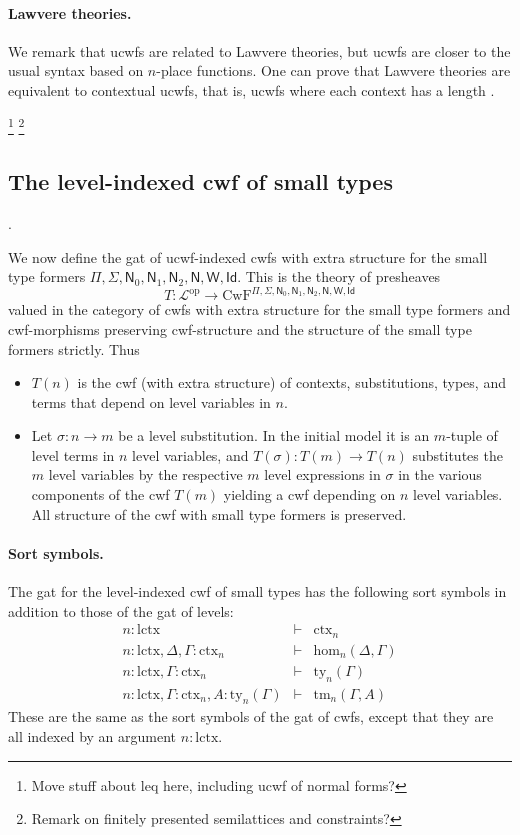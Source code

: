 \documentclass[11pt,a4paper]{article}
\theoremstyle{definition}
\newcommand{\Id}{\mathsf{Id}}
\newcommand{\N}{\mathsf{N}}
\def\Hom{\mathrm{hom}}
\def\lctx{\mathrm{lctx}}
\def\leq{\mathrm{leq}}
\newcommand{\ctx}{\mathrm{ctx}}
\newcommand{\ty}{\mathrm{ty}}
\newcommand{\tm}{\mathrm{tm}}
\def\L{{\mathcal{L}}}
\def\CwF{\mathrm{CwF}}
\def\W{\mathsf{W}}
\begin{document}
\paragraph{Lawvere theories.} We remark that ucwfs are related to Lawvere theories, but ucwfs are closer to the usual syntax based on $n$-place functions. One can prove that Lawvere theories are equivalent to contextual ucwfs, that is, ucwfs where each context has a length \cite{castellan:lambek}.

\footnote{Move stuff about $\leq$ here, including ucwf of normal forms?}
\footnote{Remark on finitely presented semilattices and constraints?}


\subsection{The level-indexed cwf of small types}\label{lcwf-sort}.

We now define the gat of ucwf-indexed cwfs with extra structure for the small type formers $\Pi,\Sigma,\N_0,\N_1,\N_2,\N,\W,\Id$. This is the theory of presheaves
$$
T : \L^\mathrm{op} \to \CwF^{\Pi,\Sigma,\N_0,\N_1,\N_2,\N,\W,\Id}
$$
valued in the category of cwfs with extra structure for the small type formers and cwf-morphisms preserving cwf-structure and the structure of the small type formers strictly. Thus
\begin{itemize}
\item
$T(n)$ is the cwf (with extra structure) of contexts, substitutions, types, and terms that depend on level variables in $n$.
\item
Let $\sigma : n \to m$ be a level substitution. In the initial model it is an $m$-tuple of level terms in $n$ level variables, and 
$T(\sigma) : T(m) \to T(n)$ substitutes the $m$ level variables by the respective $m$ level expressions in $\sigma$ in the various components of the cwf $T(m)$ yielding a cwf depending on $n$ level variables. All structure of the cwf with small type formers is preserved.
\end{itemize}

\paragraph{Sort symbols.} The gat for the level-indexed cwf of small types has the following sort symbols in addition to those of the gat of levels:
\begin{eqnarray*}
n : \lctx &\vdash& \ctx_n\\
n : \lctx, \Delta, \Gamma : \ctx_n &\vdash& \Hom_n(\Delta,\Gamma)\\
n : \lctx, \Gamma : \ctx_n &\vdash& \ty_n(\Gamma)\\
n : \lctx, \Gamma : \ctx_n, A:\ty_n(\Gamma) &\vdash& \tm_n(\Gamma,A)
\end{eqnarray*}
These are the same as the sort symbols of the gat of cwfs, except that they are all indexed by an argument $n : \lctx$.
\end{document}
